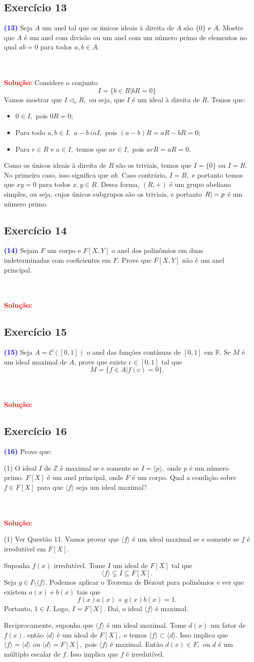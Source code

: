 \documentclass[11pt,a4paper]{article}
\newcommand{\exercicio}[1]{\subsection{Exercício #1} \textcolor{blue}{\bf(#1)}}
\newcommand{\dividiritens}[1]{\begin{tasks}[counter-format={(tsk[a])},label-width=3.6ex, label-format = {\bfseries}, column-sep = {0pt}](1) #1 \end{tasks}}
\newcommand{\pers}[1]{\textcolor{Floresta}{$\negrito{(#1)} $}}
\newcommand{\solucao}[1]{
\textbf{\textcolor{white}{oi}\\ \\ \textcolor{red}{Solução:}} #1}
\begin{document}
\exercicio{13}  Seja $A$ um anel tal que os únicos ideais à direita de $A$ são $\{0\}$ e $A.$ Mostre que $A$ é um anel com divisão ou um anel com um número primo de elementos no qual $ab = 0$ para todos $a, b \in A.$
\solucao{ Considere o conjunto
\[
I = \{ b \in R | bR = 0 \}
\]
Vamos mostrar que $I \lhd_r R,$ ou seja, que $I$ é um ideal à direita de $R.$ Temos que:
\begin{itemize}
    \item $0 \in I,$ pois $0R = 0;$
    \item Para todo $a,b \in I,$ $a - b \ in I,$ pois $(a - b)R = aR- bR = 0;$
    \item Para $r \in R$ e $a \in I,$ temos que $ar \in I,$ pois $arR = aR = 0.$
\end{itemize}

Como os únicos ideais à direita de $R$ são os triviais, temos que $I = \{0\}$ ou $I = R.$ No primeiro caso, isso significa que $ab $. Caso contrário, $I = R,$ e portanto temos que $xy = 0$ para todos $x,y \in R.$ Dessa forma, $(R, +)$ é um grupo abeliano simples, ou seja, cujos únicos subgrupos são os triviais, e portanto $\abs{R} = p$ é um número primo.
}
\exercicio{14} Sejam $F$ um corpo e $F[X,Y]$ o anel dos polinômios em duas indeterminadas com coeficientes em $F$.
Prove que $F[X, Y]$ não é um anel principal. 
\solucao{
}
\exercicio{15} Seja $A = \mathcal{C}([0, 1])$ o anel das funções contínuas de $[0, 1]$ em $\mathbb{R}.$ Se $M$ é um ideal maximal de $A$, prove que existe $c \in [0, 1]$ tal que \[M = \{f \in A | f(c) = 0\}.\]
\solucao{
}
\exercicio{16} Prove que: 
\dividiritens{
\task[\pers{a}] O ideal $I$ de $\mathbb{Z}$ é maximal se e somente se $I = \langle p \rangle,$ onde $p$ é um número primo.
\task[\pers{b}] $F[X]$ é um anel principal, onde $F$ é um corpo. Qual a condição sobre $f \in F[X]$ para que $\langle f \rangle$ seja um ideal maximal?
}
\solucao{
\dividiritens{
\task[\pers{a}] Ver Questão 11.
\task[\pers{b}] Vamos provar que $\langle f \rangle$ é um ideal maximal se e somente se $f$ é irredutível em $F[X].$

Suponha $f(x)$ irredutível. Tome $I$ um ideal de $F[X]$ tal que 
\[
\langle f \rangle \subsetneq I \subseteq F[X].
\]
Seja $g \in I \setminus \langle f \rangle.$ Podemos aplicar o Teorema de Bézout para polinômios e ver que existem $a(x)$ e $b(x)$ tais que
\[
f(x)a(x) + g(x)b(x) = 1.
\]
Portanto, $1 \in I.$ Logo, $I = F[X].$ Daí, o ideal $\langle f \rangle$ é maximal.

Reciprocamente, suponha que $\langle f \rangle$ é um ideal maximal. Tome $d(x)$ um fator de $f(x).$ então $\langle d \rangle$ é um ideal de $F[X],$ e temos $\langle f \rangle \subset \langle d \rangle.$ Isso implica que $\langle f \rangle = \langle d \rangle$ ou $\langle d \rangle = F[X],$ pois $\langle f \rangle$ é maximal. Então $d(x) \in F,$ ou $d$ é um múltiplo escalar de $f.$ Isso implica que $f$ é irredutível.
}
}
\end{document}
